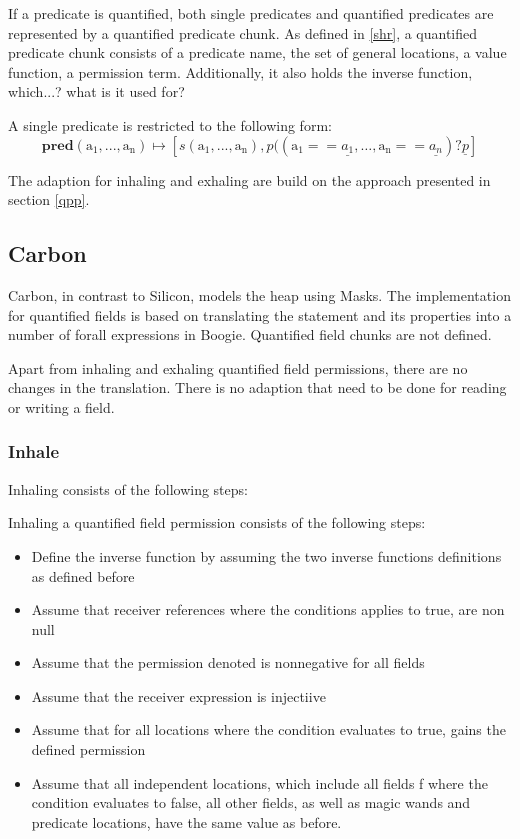 \documentclass[12pt]{article}
\begin{document}
If a predicate is quantified, both single predicates and quantified predicates are represented by a quantified predicate chunk. As defined in \ref{shr}, a quantified predicate chunk consists of a predicate name, the set of general locations, a value function, a permission term. Additionally, it also holds the inverse function, which...? what is it used for?

A single predicate is restricted to the following form:\\

\begin{equation}
	\mathbf{pred}(\mathrm{a_1, ..., a_n})\mapsto [s(\mathrm{a_1, ..., a_n}), p((\mathrm{a_1} == \underline{a_1}, \dots, \mathrm{a_n} == \underline{a_n}) ? \underline{p}]
\end{equation}

The adaption for inhaling and exhaling are build on the approach presented in section \ref{qpp}.


\subsection{Carbon}
Carbon, in contrast to Silicon, models the heap using Masks. The implementation for quantified fields is based on translating the statement and its properties into a number of forall expressions in Boogie. Quantified field chunks are not defined.

Apart from inhaling and exhaling quantified field permissions, there are no changes in the translation. There is no adaption that need to be done for reading or writing a field.

\subsubsection{Inhale}
Inhaling consists of the following steps:

Inhaling a quantified field permission consists of the following steps:
\begin{itemize}
\item Define the inverse function by assuming the two inverse functions definitions as defined before
\item Assume that receiver references where the conditions applies to true, are non null
\item Assume that the permission denoted is nonnegative for all fields
\item Assume that the receiver expression is injectiive
\item Assume that for all locations where the condition evaluates to true, gains the defined permission
\item Assume that all independent locations, which include all fields f where the condition evaluates to false, all other fields, as well as magic wands and predicate locations, have the same value as before.
\end{itemize}
\end{document}
